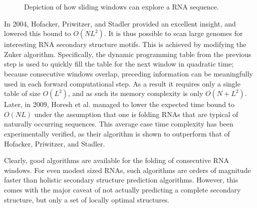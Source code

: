 \documentclass{cshonours}
\begin{document}
\begin{figure}
\begin{center}
\end{center}
\caption{Depiction of how sliding windows can explore a RNA sequence.}
\label{fig:slidingwindow}
\end{figure}

In 2004, Hofacker, Priwitzer, and Stadler \cite{hofacker2004prediction} provided an excellent insight, and lowered this bound to $O(NL^2)$. It is thus possible to scan large genomes
for interesting RNA secondary structure motifs. This is achieved by modifying the Zuker algorithm. Specifically, the dynamic programming table from the previous step is used to quickly fill the table for
the next window in quadratic time; because consecutive windows overlap, preceding information can be meaningfully used in each forward computational step.
As a result it requires only a single table of size $O(L^2)$, and as such its memory complexity is only $O(N + L^2)$. Later, in 2009, Horesh et al. \cite{horesh2009rnaslider} managed
to lower the expected time bound to $O(NL)$ under the assumption that one is
folding RNAs that are typical of naturally occurring sequences. This average case time complexity has been experimentally verified, as their algorithm is shown to outperform that of Hofacker, Priwitzer, and Stadler. 

Clearly, good algorithms are
available for the folding of consecutive RNA windows. For even modest sized
RNAs, such algorithms are orders of magnitude faster than holistic secondary
structure prediction algorithms. However, this comes with the major caveat of not actually predicting
a complete secondary structure, but only a set of locally optimal structures.
\end{document}
